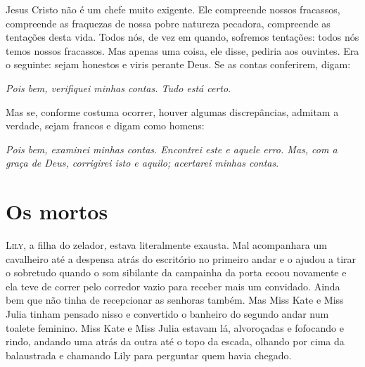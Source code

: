 Jesus Cristo não é um chefe muito exigente.  Ele compreende nossos fracassos,
compreende as fraquezas de nossa pobre natureza pecadora, compreende as
tentações desta vida.  Todos nós, de vez em quando, sofremos tentações: todos
nós temos nossos fracassos.  Mas apenas uma coisa, ele disse, pediria aos
ouvintes.  Era o seguinte: sejam honestos e viris perante Deus.  Se as contas
conferirem, digam:

\textit{Pois bem, verifiquei minhas contas.  Tudo está certo}.  

Mas se, conforme costuma ocorrer, houver algumas discrepâncias, admitam a
verdade, sejam francos e digam como homens:

\textit{Pois bem, examinei minhas contas.  Encontrei este e aquele erro.
Mas, com a graça de Deus, corrigirei isto e aquilo; acertarei minhas
contas}.


\chapter{Os mortos}

\textsc{Lily,} a filha do zelador, estava literalmente exausta.  Mal
acompanhara um cavalheiro até a despensa atrás do escritório no primeiro andar
e o ajudou a tirar o sobretudo quando o som sibilante da campainha da porta
ecoou novamente e ela teve de correr pelo corredor vazio para receber mais um
convidado.  Ainda bem que não tinha de recepcionar as senhoras também.  Mas
Miss Kate e Miss Julia tinham pensado nisso e convertido o banheiro do segundo
andar num toalete feminino.  Miss Kate e Miss Julia estavam lá, alvoroçadas e
fofocando e rindo, andando uma atrás da outra até o topo da escada, olhando por
cima da balaustrada e chamando Lily para perguntar quem havia chegado.

